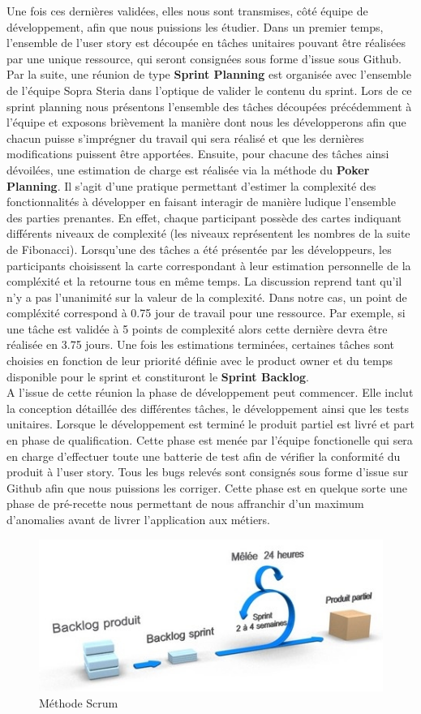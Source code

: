 	Une fois ces dernières validées, elles nous sont transmises, côté équipe de développement, afin que nous puissions les étudier. Dans un premier temps, l’ensemble de l’user story est découpée en tâches unitaires pouvant être réalisées par une unique ressource, qui seront consignées sous forme d’issue sous Github. Par la suite, une réunion de type \textbf{Sprint Planning} est organisée avec l'ensemble de l'équipe Sopra Steria dans l’optique de valider le contenu du sprint. Lors de ce sprint planning nous présentons l’ensemble des tâches découpées précédemment à l’équipe et exposons brièvement la manière dont nous les développerons afin que chacun puisse s’imprégner du travail qui sera réalisé et que les dernières modifications puissent être apportées. Ensuite, pour chacune des tâches ainsi dévoilées, une estimation de charge est réalisée via la méthode du \textbf{Poker Planning}. Il s’agit d’une pratique permettant d’estimer la complexité des fonctionnalités à développer en faisant interagir de manière ludique l’ensemble des parties prenantes. En effet, chaque participant possède des cartes indiquant différents niveaux de complexité (les niveaux représentent les nombres de la suite de Fibonacci). Lorsqu’une des tâches a été présentée par les développeurs, les participants choisissent la carte correspondant à leur estimation personnelle de la compléxité et la retourne tous en même temps. La discussion reprend tant qu’il n’y a pas l’unanimité sur la valeur de la complexité. Dans notre cas, un point de compléxité correspond à 0.75 jour de travail pour une ressource. Par exemple, si une tâche est validée à 5 points de complexité alors cette dernière devra être réalisée en 3.75 jours. Une fois les estimations terminées, certaines tâches sont choisies en fonction de leur priorité définie avec le product owner et du temps disponible pour le sprint et constituront le \textbf{Sprint Backlog}.\\
	
	A l'issue de cette réunion la phase de développement peut commencer. Elle inclut la conception détaillée des différentes tâches, le développement ainsi que les tests unitaires. Lorsque le développement est terminé le produit partiel est livré et part en phase de qualification. Cette phase est menée par l'équipe fonctionelle qui sera en charge d'effectuer toute une batterie de test afin de vérifier la conformité du produit à l'user story. Tous les bugs relevés sont consignés sous forme d'issue sur Github afin que nous puissions les corriger. Cette phase est en quelque sorte une phase de pré-recette nous permettant de nous affranchir d'un maximum d'anomalies avant de livrer l'application aux métiers.

\begin{figure}[h!]
	\includegraphics[scale=0.7]{images/travailBP1818/scrum.jpg}
	\centering
	\caption{Méthode Scrum}
	\label{scrum}
\end{figure}